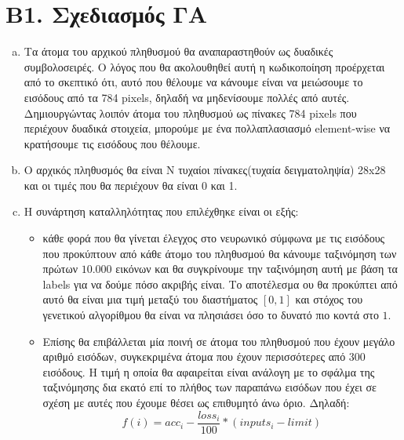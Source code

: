 \documentclass[12pt,a4paper]{article}
\newcommand{\tl}{\textlatin}
\begin{document}
        \section*{Β1. Σχεδιασμός ΓΑ}
            \begin{enumerate}[a)]
                \item Τα άτομα του αρχικού πληθυσμού θα αναπαραστηθούν ως
                    δυαδικές συμβολοσειρές. Ο λόγος που θα ακολουθηθεί αυτή η
                    κωδικοποίηση προέρχεται από το σκεπτικό ότι, αυτό που
                    θέλουμε να κάνουμε είναι να μειώσουμε το εισόδους από τα 784
                    \tl{pixels}, δηλαδή να μηδενίσουμε πολλές από αυτές.
                    Δημιουργώντας λοιπόν άτομα του πληθυσμού ως πίνακες 784
                    \tl{pixels} που περιέχουν δυαδικά στοιχεία, μπορούμε με ένα
                    πολλαπλασιασμό \tl{element-wise} να κρατήσουμε τις εισόδους που
                    θέλουμε.
                \item Ο αρχικός πληθυσμός θα είναι \tl{N} τυχαίοι πίνακες(τυχαία
                    δειγματοληψία)
                    28\tl{x}28 και οι τιμές που θα περιέχουν θα είναι 0 και 1.
                \item Η συνάρτηση καταλληλότητας που επιλέχθηκε είναι οι εξής:
                    \begin{itemize}
                        
                        \item κάθε φορά που θα γίνεται έλεγχος στο νευρωνικό
                            σύμφωνα με τις εισόδους που προκύπτουν από κάθε
                            άτομο του πληθυσμού θα κάνουμε ταξινόμηση των πρώτων
                            $10.000$ εικόνων και θα συγκρίνουμε την ταξινόμηση
                            αυτή με βάση τα \tl{labels} για να δούμε πόσο
                            ακριβής είναι. Το αποτέλεσμα ου θα προκύπτει από
                            αυτό θα είναι μια τιμή μεταξύ του διαστήματος
                            $[0,1]$
                            και στόχος του γενετικού αλγορίθμου θα είναι να
                            πλησιάσει όσο το δυνατό πιο κοντά στο $1$.
                        \item Επίσης θα επιβάλλεται μία ποινή σε άτομα του
                            πληθυσμού που έχουν μεγάλο αριθμό εισόδων,
                            συγκεκριμένα άτομα που έχουν περισσότερες από $300$
                            εισόδους. Η τιμή η οποία θα αφαιρείται είναι
                            ανάλογη με το σφάλμα της ταξινόμησης δια εκατό επί
                            το πλήθος των παραπάνω εισόδων που έχει σε σχέση με
                            αυτές που έχουμε θέσει ως επιθυμητό άνω όριο.
                            Δηλαδή:
                            $$ f(i) = acc_i - \frac{loss_i}{100}*(inputs_i - limit)$$


\end{itemize}
\end{enumerate}
\end{document}
